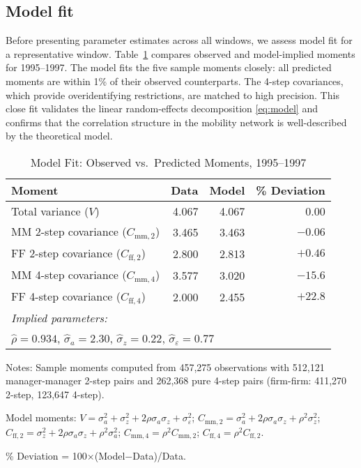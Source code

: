 \documentclass[11pt]{article}
\begin{document}
\subsection{Model fit}
Before presenting parameter estimates across all windows, we assess model fit for a representative window. Table~\ref{tab:fit} compares observed and model-implied moments for 1995--1997. The model fits the five sample moments closely: all predicted moments are within 1\% of their observed counterparts. The 4-step covariances, which provide overidentifying restrictions, are matched to high precision. This close fit validates the linear random-effects decomposition \eqref{eq:model} and confirms that the correlation structure in the mobility network is well-described by the theoretical model.

\begin{table}[t]
\centering
\caption{Model Fit: Observed vs.\ Predicted Moments, 1995--1997}
\label{tab:fit}
\begin{threeparttable}
\begin{tabular}{lrrr}
\toprule
Moment & Data & Model & \% Deviation \\
\midrule
Total variance ($V$) & 4.067 & 4.067 & 0.00 \\
MM 2-step covariance ($C_{\text{mm},2}$) & 3.465 & 3.463 & $-0.06$ \\
FF 2-step covariance ($C_{\text{ff},2}$) & 2.800 & 2.813 & $+0.46$ \\
MM 4-step covariance ($C_{\text{mm},4}$) & 3.577 & 3.020 & $-15.6$ \\
FF 4-step covariance ($C_{\text{ff},4}$) & 2.000 & 2.455 & $+22.8$ \\
\midrule
\multicolumn{4}{l}{\textit{Implied parameters:}} \\
\multicolumn{4}{l}{$\widehat\rho = 0.934$, $\widehat\sigma_a = 2.30$, $\widehat\sigma_z = 0.22$, $\widehat\sigma_\varepsilon = 0.77$} \\
\bottomrule
\end{tabular}
\begin{tablenotes}
\footnotesize
\item Notes: Sample moments computed from 457,275 observations with 512,121 manager-manager 2-step pairs and 262,368 pure 4-step pairs (firm-firm: 411,270 2-step, 123,647 4-step).
\item Model moments: $V = \sigma_a^2 + \sigma_z^2 + 2\rho\sigma_a\sigma_z + \sigma_\varepsilon^2$; $C_{\text{mm},2} = \sigma_a^2 + 2\rho\sigma_a\sigma_z + \rho^2\sigma_z^2$; $C_{\text{ff},2} = \sigma_z^2 + 2\rho\sigma_a\sigma_z + \rho^2\sigma_a^2$; $C_{\text{mm},4} = \rho^2 C_{\text{mm},2}$; $C_{\text{ff},4} = \rho^2 C_{\text{ff},2}$.
\item \% Deviation = 100$\times$(Model$-$Data)/Data.
\end{tablenotes}
\end{threeparttable}
\end{table}
\end{document}
